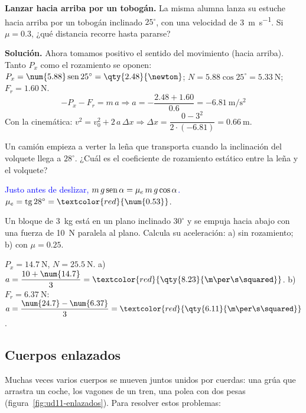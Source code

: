 \begin{example}
    \textbf{Lanzar hacia arriba por un tobogán.} La misma alumna lanza su estuche hacia arriba por un tobogán inclinado \(25^\circ\),
    con una velocidad de \qty{3}{\m\per\s}. Si \(\mu = \num{0.3}\), ¿qué distancia recorre hasta pararse?

    \textbf{Solución.} Ahora tomamos positivo el sentido del movimiento (hacia arriba). Tanto \(P_x\) como el rozamiento se oponen:
    \(P_x = \num{5.88}\sen 25^\circ = \qty{2.48}{\newton}\); \(N = \num{5.88}\cos 25^\circ = \qty{5.33}{\newton}\); \(F_r = \qty{1.60}{\newton}\).
    \[ -P_x - F_r = m\,a \Rightarrow a = -\frac{\num{2.48} + \num{1.60}}{\num{0.6}} = \qty{-6.81}{\m\per\s\squared} \]
    Con la cinemática: \(v^2 = v_0^2 + 2\,a\,\Delta x \Rightarrow \Delta x = \dfrac{0 - 3^2}{2 \cdot (\num{-6.81})} = \qty{0.66}{\m}\).
\end{example}

\begin{exercise}
    Un camión empieza a verter la leña que transporta cuando la inclinación del volquete llega a \(28^\circ\). ¿Cuál es el
    coeficiente de rozamiento estático entre la leña y el volquete?
    \begin{solu}
        \textcolor{blue}{Justo antes de deslizar, \(m\,g\operatorname{sen}\alpha = \mu_e\,m\,g\cos\alpha\).} \(\mu_e = \tg 28^\circ = \textcolor{red}{\num{0.53}}\).
    \end{solu}
\end{exercise}

\begin{exercise}
    Un bloque de \qty{3}{\kg} está en un plano inclinado \(30^\circ\) y se empuja hacia abajo con una fuerza de \qty{10}{\newton}
    paralela al plano. Calcula su aceleración: a) sin rozamiento; b) con \(\mu = \num{0.25}\).
    \begin{solu}
        \(P_x = \qty{14.7}{\newton}\), \(N = \qty{25.5}{\newton}\). a) \(a = \dfrac{10 + \num{14.7}}{3} = \textcolor{red}{\qty{8.23}{\m\per\s\squared}}\).
        b) \(F_r = \qty{6.37}{\newton}\): \(a = \dfrac{\num{24.7} - \num{6.37}}{3} = \textcolor{red}{\qty{6.11}{\m\per\s\squared}}\).
    \end{solu}
\end{exercise}

\subsection{Cuerpos enlazados}

Muchas veces varios cuerpos se mueven juntos unidos por cuerdas: una grúa que arrastra un coche, los vagones de un tren, una polea con
dos pesas (figura~\ref{fig:ud11-enlazados}). Para resolver estos problemas:

